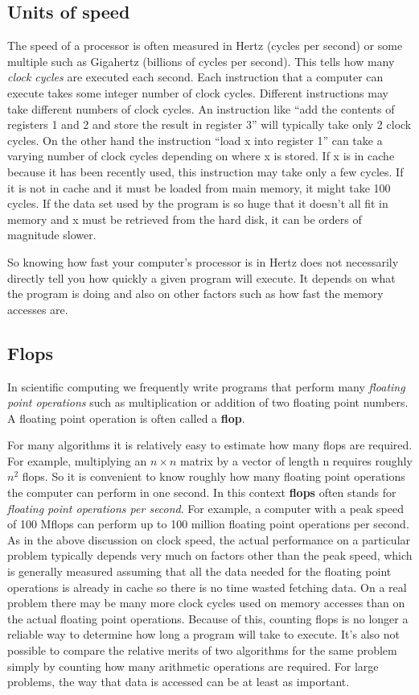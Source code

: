 \documentclass[letterpaper,10pt,english]{sphinxmanual}
\begin{document}
\subsection{Units of speed}
\label{metrics:units-of-speed}
The speed of a processor is often measured in Hertz (cycles per second)
or some multiple such as Gigahertz (billions of cycles per second).  This
tells how many \emph{clock cycles} are executed each second.  Each instruction
that a computer can execute takes some integer number of clock cycles.
Different instructions may take different numbers of clock cycles.  An
instruction like ``add the contents of registers 1 and 2 and store the result
in register 3'' will typically take only 2 clock cycles.  On the other hand
the instruction ``load x into register 1'' can take a varying number of clock
cycles depending on where x is stored. If x is in cache because it has been
recently used, this instruction may take only a few cycles.  If it is not in
cache and it must be loaded from main memory, it might take 100 cycles.  If
the data set used by the program is so huge that it doesn't all fit in
memory and x must be retrieved from the hard disk, it can be orders of
magnitude slower.

So knowing how fast your computer's processor is in Hertz does not
necessarily directly tell you how quickly a given program will execute.  It
depends on what the program is doing and also on other factors such as how
fast the memory accesses are.


\subsection{Flops}
\label{metrics:flops}\label{metrics:id2}
In scientific computing we frequently write programs that perform many
\emph{floating point operations} such as multiplication or addition of two
floating point numbers.  A floating point operation is often called
a \textbf{flop}.

For many algorithms it is relatively easy to estimate how many flops are
required.  For example, multiplying an $n\times n$
matrix by a vector of length n
requires roughly $n^2$ flops.  So it is convenient to know roughly how
many floating point operations the computer can perform in one second.  In
this context \textbf{flops} often stands for \emph{floating point operations per
second}.  For example, a computer with a peak speed of 100 Mflops can
perform up to 100 million floating point operations per second.  As in the
above discussion on clock speed, the actual performance on a particular problem
typically depends very much on factors other than the peak speed, which is
generally measured assuming that all the data needed for the floating point
operations is already in cache so there is no time wasted fetching data.  On
a real problem there may be many more clock cycles used on memory accesses
than on the actual floating point operations.
Because of this, counting flops is no longer a reliable way to determine
how long a program will take to execute.  It's also not possible to
compare the relative merits of two algorithms for the same problem simply by
counting how many arithmetic operations are required.  For large problems,
the way that data is accessed can be at least as important.
\end{document}
